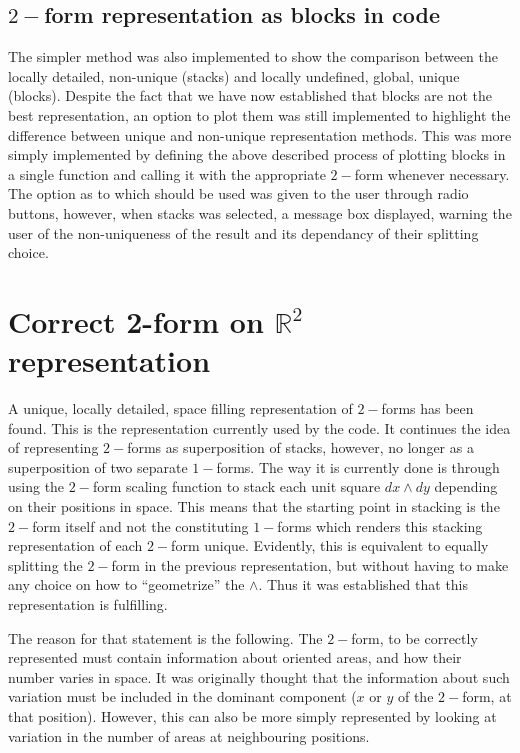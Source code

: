 \documentclass[12pt]{report}
\begin{document}
\subsection{$2-$form representation as blocks in code}
The simpler method was also implemented to show the comparison between the locally detailed, non-unique (stacks) and locally undefined, global, unique (blocks). Despite the fact that we have now established that blocks are not the best representation, an option to plot them was still implemented to highlight the difference between unique and non-unique representation methods. 
This was more simply implemented by defining the above described process of plotting blocks in a single function and calling it with the appropriate $2-$form whenever necessary.
The option as to which should be used was given to the user through radio buttons, however, when stacks was selected, a message box displayed, warning the user of the non-uniqueness of the result and its dependancy of their splitting choice.

\section{Correct 2-form on $\mathbb{R}^{2}$ representation}
A unique, locally detailed, space filling representation of $2-$forms has been found. This is the representation currently used by the code. It continues the idea of representing $2-$forms as superposition of stacks, however, no longer as a superposition of two separate $1-$forms. The way it is currently done is through using the $2-$form scaling function to stack each unit square $dx\wedge dy$ depending on their positions in space. This means that the starting point in stacking is the $2-$form itself and not the constituting $1-$forms which renders this stacking representation of each $2-$form unique. Evidently, this is equivalent to equally splitting the $2-$form in the previous representation, but without having to make any choice on how to ``geometrize'' the $\wedge$. Thus it was established that this representation is fulfilling.

The reason for that statement is the following. The $2-$form, to be correctly represented must contain information about oriented areas, and how their number varies in space. It was originally thought that the information about such variation must be included in the dominant component ($x$ or $y$ of the $2-$form, at that position). However, this can also be more simply represented by looking at variation in the number of areas at neighbouring positions.
\end{document}
